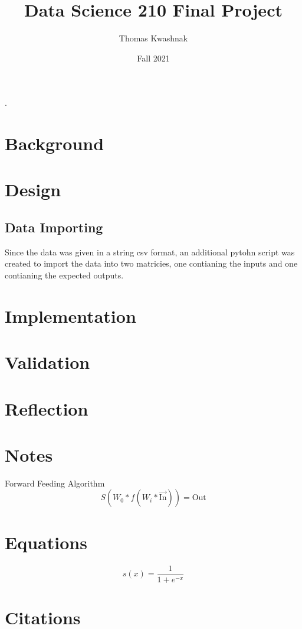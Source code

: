 \documentclass[10pt]{article}
\title{Data Science 210 Final Project}
\author{Thomas Kwashnak}
\date{Fall 2021}
\begin{document}
\maketitle
\setlength{\parindent}{0pt}.
\setlength{\parskip}{\baselineskip}
\lstset{numbers=left, numberstyle=\footnotesize, frame=l} 


\section{Background}
\section{Design}



\subsection{Data Importing}
Since the data was given in a string csv format, an additional pytohn script was created to import the data into two matricies, one contianing the inputs and one contianing the expected outputs.


\section{Implementation}
\section{Validation}
\section{Reflection}

\section{Notes}
Forward Feeding Algorithm
$$S(W_0 * f(W_i * \vec{\text{In}})) = \text{Out}$$

\section{Equations}
$$s(x) = \frac{1}{1 + e^{-x}}$$
\section{Citations}
\printbibliography
\end{document}
